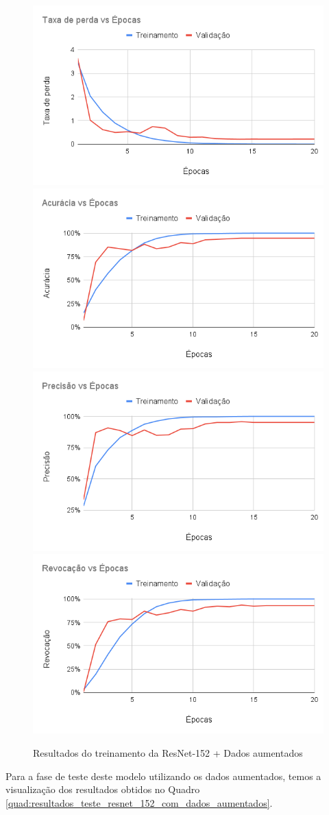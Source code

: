 \documentclass[
	12pt,				%
	oneside,			%
	a4paper,			%
	english,			%
	brazil				%
	]{abntex2ppgsi}
\begin{document}
\begin{figure}[H]
    \centering
    \caption{Resultados do treinamento da ResNet-152 + Dados aumentados}
    \includegraphics[width=.50\textwidth]{imagens/resultados_discussao/architecture/resnet_152/augmented/perda.png}\hfill
    \includegraphics[width=.50\textwidth]{imagens/resultados_discussao/architecture/resnet_152/augmented/acuracia.png}\bigbreak    \includegraphics[width=.50\textwidth]{imagens/resultados_discussao/architecture/resnet_152/augmented/precisao.png}\hfill
    \includegraphics[width=.50\textwidth]{imagens/resultados_discussao/architecture/resnet_152/augmented/revocacao.png}
    \label{fig:resnet_152_dados_aumentados}
\end{figure}

Para a fase de teste deste modelo utilizando os dados aumentados, temos a visualização dos resultados obtidos no Quadro \ref{quad:resultados_teste_resnet_152_com_dados_aumentados}.
\end{document}
